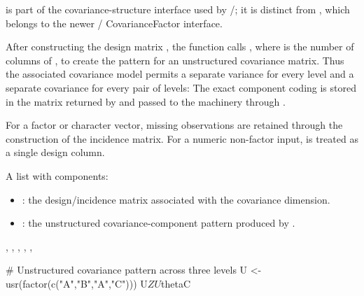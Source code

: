 \documentclass[a4paper]{book}
\begin{document}
%
\begin{Details}\relax
{} is part of the covariance-structure interface used by /; it is distinct from , which belongs to the newer / CovarianceFactor interface.

After constructing the design matrix , the function calls , where  is the number of columns of , to create the  pattern for an unstructured covariance matrix. Thus the associated covariance model permits a separate variance for every level and a separate covariance for every pair of levels:
The exact component coding is stored in the matrix returned by  and passed to the  machinery through .

For a factor or character vector, missing observations are retained through the construction of the incidence matrix. For a numeric non-factor input,  is treated as a single design column.
\end{Details}
%
\begin{Value}
A list with components:
\begin{itemize}

\item{} : the design/incidence matrix associated with the covariance dimension.
\item{} : the unstructured covariance-component pattern produced by .

\end{itemize}

\end{Value}
%
\begin{SeeAlso}\relax
{}, , , ,
, 
\end{SeeAlso}
%
\begin{Examples}
\begin{ExampleCode}
# Unstructured covariance pattern across three levels
U <- usr(factor(c("A","B","A","C")))
U$Z
U$thetaC
\end{ExampleCode}
\end{Examples}
\end{document}
